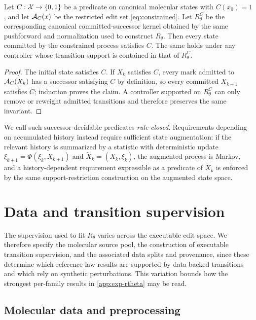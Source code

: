 \begin{proposition}
\label{prop:pathwise}
Let $C:\mathcal{X}\to\{0,1\}$ be a predicate on canonical molecular states with $C(x_0)=1$, and let $\mathcal{A}_C(x)$ be the restricted edit set \eqref{eq:constrained}. Let $R^{C}_\theta$ be the corresponding canonical committed-successor kernel obtained by the same pushforward and normalization used to construct $R_\theta$. Then every state committed by the constrained process satisfies $C$. The same holds under any controller whose transition support is contained in that of $R^{C}_\theta$.
\end{proposition}

\begin{proof}
The initial state satisfies $C$. If $X_k$ satisfies $C$, every mark admitted to $\mathcal{A}_C(X_k)$ has a successor satisfying $C$ by definition, so every committed $X_{k+1}$ satisfies $C$; induction proves the claim. A controller supported on $R^{C}_\theta$ can only remove or reweight admitted transitions and therefore preserves the same invariant.
\end{proof}

We call such successor-decidable predicates \emph{rule-closed}. Requirements depending on accumulated history instead require sufficient state augmentation: if the relevant history is summarized by a statistic with deterministic update $\xi_{k+1}=\Phi(\xi_k,X_{k+1})$ and $\widetilde X_k=(X_k,\xi_k)$, the augmented process is Markov, and a history-dependent requirement expressible as a predicate of $\widetilde X_k$ is enforced by the same support-restriction construction on the augmented state space.


\section{Data and transition supervision}
\label{app:data}

The supervision used to fit $R_\theta$ varies across the executable edit space. We therefore specify the molecular source pool, the construction of executable transition supervision, and the associated data splits and provenance, since these determine which reference-law results are supported by data-backed transitions and which rely on synthetic perturbations. This variation bounds how the strongest per-family results in \cref{app:exp-rtheta} may be read.

\subsection{Molecular data and preprocessing}

